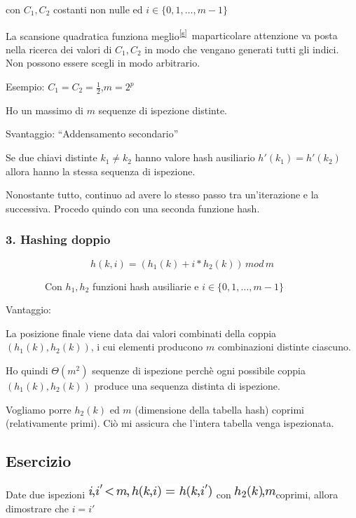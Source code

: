 \documentclass{article}
\begin{document}
{con $C_1,C_2$ costanti non nulle ed $i \in \{0,1,\ldots,m-1\}$}

{La scansione quadratica funziona meglio}\textsuperscript{\protect\hyperlink{cmnt19}{{[}s{]}}}{~maparticolare attenzione va posta nella ricerca dei valori di $C_1,C_2$ in modo che vengano generati tutti gli indici. Non possono essere scegli in modo arbitrario.}

{Esempio: $C_1=C_2=\frac{1}{2}$,$m=2^p$}

{Ho un massimo di $m$ sequenze di ispezione distinte.}

{Svantaggio}{: ``Addensamento secondario''}

{Se due chiavi distinte $k_1 \neq k_2$ hanno valore hash ausiliario $h'(k_1) = h'(k_2)$ allora hanno la stessa sequenza di ispezione.}

{Nonostante tutto, continuo ad avere lo stesso passo tra un'iterazione e la successiva. Procedo quindo con una seconda funzione hash.}

\subsubsection{3. Hashing doppio}

\begin{equation}
h(k,i) = (h_1(k) + i*h_2(k))\,mod\,m
\end{equation}		

{~~~~~~~~Con $h_1,h_2$ funzioni hash ausiliarie e $i \in \{0,1,\ldots,m-1\}$}

{Vantaggio:}

{La posizione finale viene data dai valori combinati della coppia $(h_1(k),h_2(k))$, i cui elementi producono $m$ combinazioni distinte ciascuno.}

{Ho quindi $\Theta(m^2)$ sequenze di ispezione perchè ogni possibile coppia $(h_1(k),h_2(k))$ produce una sequenza distinta di ispezione.}

{Vogliamo porre $h_2(k)$ ed $m$ (dimensione della tabella hash) coprimi (relativamente primi). Ciò mi assicura che l'intera tabella venga ispezionata.}

\subsection{Esercizio}

{Date due ispezioni }\includegraphics{images/image300.png}{~con
}\includegraphics{images/image301.png}{coprimi, allora dimostrare che $i=i'$}
\end{document}
